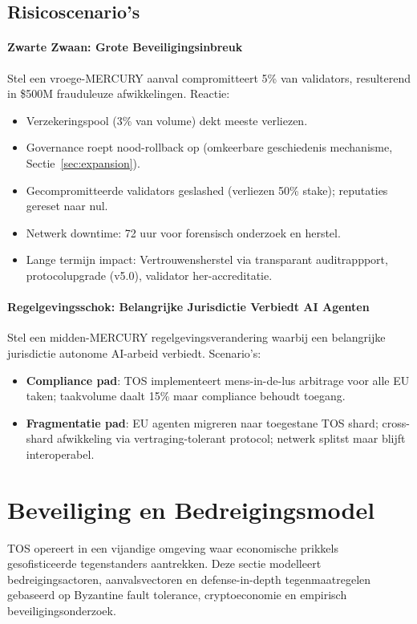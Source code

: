 \documentclass[11pt]{article}
\begin{document}
\subsection{Risicoscenario's}
\paragraph{Zwarte Zwaan: Grote Beveiligingsinbreuk}
Stel een vroege-MERCURY aanval compromitteert 5\% van validators, resulterend in \$500M frauduleuze afwikkelingen. Reactie:
\begin{itemize}[noitemsep]
  \item Verzekeringspool (3\% van volume) dekt meeste verliezen.
  \item Governance roept nood-rollback op (omkeerbare geschiedenis mechanisme, Sectie~\ref{sec:expansion}).
  \item Gecompromitteerde validators geslashed (verliezen 50\% stake); reputaties gereset naar nul.
  \item Netwerk downtime: 72 uur voor forensisch onderzoek en herstel.
  \item Lange termijn impact: Vertrouwensherstel via transparant auditrappport, protocolupgrade (v5.0), validator her-accreditatie.
\end{itemize}

\paragraph{Regelgevingsschok: Belangrijke Jurisdictie Verbiedt AI Agenten}
Stel een midden-MERCURY regelgevingsverandering waarbij een belangrijke jurisdictie autonome AI-arbeid verbiedt. Scenario's:
\begin{itemize}[noitemsep]
  \item \textbf{Compliance pad}: TOS implementeert mens-in-de-lus arbitrage voor alle EU taken; taakvolume daalt 15\% maar compliance behoudt toegang.
  \item \textbf{Fragmentatie pad}: EU agenten migreren naar toegestane TOS shard; cross-shard afwikkeling via vertraging-tolerant protocol; netwerk splitst maar blijft interoperabel.
\end{itemize}

\section{Beveiliging en Bedreigingsmodel}
\label{sec:security}

TOS opereert in een vijandige omgeving waar economische prikkels gesofisticeerde tegenstanders aantrekken. Deze sectie modelleert bedreigingsactoren, aanvalsvectoren en defense-in-depth tegenmaatregelen gebaseerd op Byzantine fault tolerance, cryptoeconomie en empirisch beveiligingsonderzoek.
\end{document}
